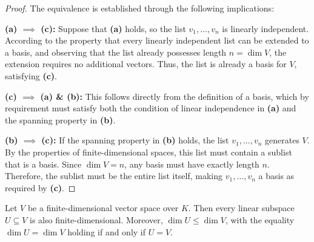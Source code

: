 \begin{proof}
The equivalence is established through the following implications:

\textbf{(a) $\implies$ (c):} Suppose that \textbf{(a)} holds, so the list $v_1, \dots, v_n$ is linearly independent. According to the property that every linearly independent list can be extended to a basis, and observing that the list already possesses length $n = \dim V$, the extension requires no additional vectors. Thus, the list is already a basis for $V$, satisfying \textbf{(c)}.

\textbf{(c) $\implies$ (a) \& (b):} This follows directly from the definition of a basis, which by requirement must satisfy both the condition of linear independence in \textbf{(a)} and the spanning property in \textbf{(b)}.

\textbf{(b) $\implies$ (c):} If the spanning property in \textbf{(b)} holds, the list $v_1, \dots, v_n$ generates $V$. By the properties of finite-dimensional spaces, this list must contain a sublist that is a basis. Since $\dim V = n$, any basis must have exactly length $n$. Therefore, the sublist must be the entire list itself, making $v_1, \dots, v_n$ a basis as required by \textbf{(c)}.
\end{proof}



\begin{proposition}
\label{prop:12.2}
Let $V$ be a finite-dimensional vector space over $K$. Then every linear subspace $U \subseteq V$ is also finite-dimensional. Moreover, $\dim U \le \dim V$, with the equality $\dim U = \dim V$ holding if and only if $U = V$.
\end{proposition}

